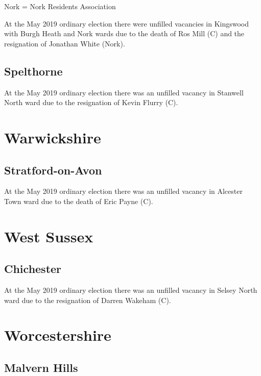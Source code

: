 \documentclass[a4paper,openany]{book}
\begin{document}
\begin{resultsiii}
Nork = Nork Residents Association

At the May 2019 ordinary election there were unfilled vacancies in Kingswood with Burgh Heath and Nork wards due to the death of Ros Mill (C) and the resignation of Jonathan White (Nork).

\subsection*{Spelthorne}

At the May 2019 ordinary election there was an unfilled vacancy in Stanwell North ward due to the resignation of Kevin Flurry (C).

\section{Warwickshire}

\subsection*{Stratford-on-Avon}

At the May 2019 ordinary election there was an unfilled vacancy in Alcester Town ward due to the death of Eric Payne (C).

\section{West Sussex}

\subsection*{Chichester}

At the May 2019 ordinary election there was an unfilled vacancy in Selsey North ward due to the resignation of Darren Wakeham (C).

\section{Worcestershire}

\subsection*{Malvern Hills}


\end{resultsiii}
\end{document}
